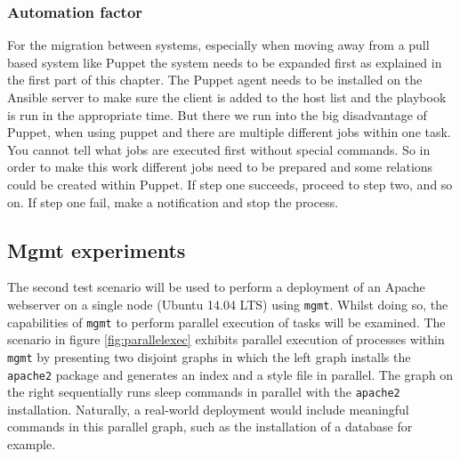 \subsubsection{Automation factor}\label{subsec:expectations}
For the migration between systems, especially when moving away from a pull based system like Puppet the system needs to be expanded first as explained in the first part of this chapter. The Puppet agent needs to be installed on the Ansible server to make sure the client is added to the host list and the playbook is run in the appropriate time. But there we run into the big disadvantage of Puppet, when using puppet and there are multiple different jobs within one task. You cannot tell what jobs are executed first without special commands. So in order to make this work different jobs need to be prepared and some relations could be created within Puppet. If step one succeeds, proceed to step two, and so on. If step one fail, make a notification and stop the process.  

\subsection{Mgmt experiments}
The second test scenario will be used to perform a deployment of an Apache webserver on a single node (Ubuntu 14.04 LTS) using \texttt{mgmt}. Whilst doing so, the capabilities of \texttt{mgmt} to perform parallel execution of tasks will be examined. The scenario in figure \ref{fig:parallelexec} exhibits parallel execution of processes within \texttt{mgmt} by presenting two disjoint graphs in which the left graph installs the \texttt{apache2} package and generates an index and a style file in parallel. The graph on the right sequentially runs sleep commands in parallel with the \texttt{apache2} installation. Naturally, a real-world deployment would include meaningful commands in this parallel graph, such as the installation of a database for example.  

